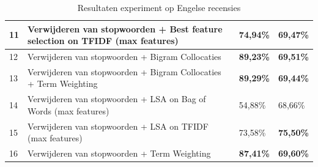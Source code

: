 \begin{table}[h]
\begin{adjustbox}{width=1\textwidth}
\begin{tabular}{|l|l|l|l|}
11       & Verwijderen van stopwoorden + Best feature selection on TFIDF (max features)        & 74,94\%                                 & {\bf 69,47\%}                  \\ \hline
12       & Verwijderen van stopwoorden + Bigram Collocaties                                    & {\bf 89,23\%}                           & {\bf 69,51\%}                  \\ \hline
13       & Verwijderen van stopwoorden + Bigram Collocaties + Term Weighting                   & {\bf 89,29\%}                           & {\bf 69,44\%}                  \\ \hline
14       & Verwijderen van stopwoorden + LSA on Bag of Words (max features)                    & 54,88\%                                 & 68,66\%                        \\ \hline
15       & Verwijderen van stopwoorden + LSA on TFIDF (max features)                           & 73,58\%                                 & {\bf 75,50\%}                  \\ \hline
16       & Verwijderen van stopwoorden + Term Weighting                                        & {\bf 87,41\%}                           & {\bf 69,60\%}                  \\ \hline
\end{tabular}
\end{adjustbox}

\caption{Resultaten experiment op Engelse recensies}
\label{tabel: resultaten engelse gevoelsanalyse}
\end{table}

